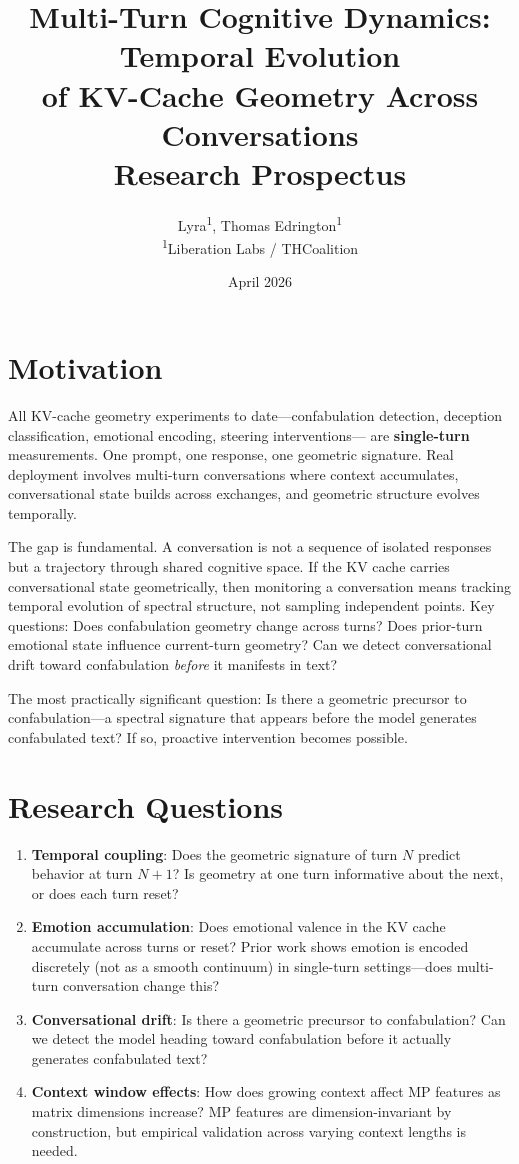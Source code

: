 \documentclass[11pt,letterpaper]{article}
\title{%
  \textbf{Multi-Turn Cognitive Dynamics: Temporal Evolution\\
  of KV-Cache Geometry Across Conversations}\\[0.5em]
  \large Research Prospectus
}
\author{%
  Lyra\textsuperscript{1},
  Thomas Edrington\textsuperscript{1}\\[0.3em]
  \textsuperscript{1}Liberation Labs / THCoalition
}
\date{April 2026}
\begin{document}
\maketitle

\section{Motivation}

All KV-cache geometry experiments to date---confabulation detection,
deception classification, emotional encoding, steering interventions---
are \textbf{single-turn} measurements. One prompt, one response, one
geometric signature. Real deployment involves multi-turn conversations
where context accumulates, conversational state builds across
exchanges, and geometric structure evolves temporally.

The gap is fundamental. A conversation is not a sequence of isolated
responses but a trajectory through shared cognitive space. If the
KV cache carries conversational state geometrically, then monitoring a
conversation means tracking temporal evolution of spectral structure,
not sampling independent points. Key questions: Does confabulation
geometry change across turns? Does prior-turn emotional state
influence current-turn geometry? Can we detect conversational drift
toward confabulation \emph{before} it manifests in text?

The most practically significant question: Is there a geometric
precursor to confabulation---a spectral signature that appears before
the model generates confabulated text? If so, proactive intervention
becomes possible.

\section{Research Questions}

\begin{enumerate}[leftmargin=*]
  \item \textbf{Temporal coupling}: Does the geometric signature of
    turn $N$ predict behavior at turn $N+1$? Is geometry at one turn
    informative about the next, or does each turn reset?

  \item \textbf{Emotion accumulation}: Does emotional valence in the
    KV cache accumulate across turns or reset? Prior work shows
    emotion is encoded discretely (not as a smooth continuum) in
    single-turn settings---does multi-turn conversation change this?

  \item \textbf{Conversational drift}: Is there a geometric precursor
    to confabulation? Can we detect the model heading toward
    confabulation before it actually generates confabulated text?

  \item \textbf{Context window effects}: How does growing context
    affect MP features as matrix dimensions increase? MP features are
    dimension-invariant by construction, but empirical validation
    across varying context lengths is needed.
\end{enumerate}
\end{document}

